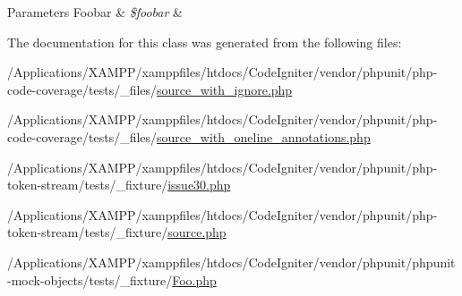 \begin{DoxyParams}[1]{Parameters}
Foobar & {\em \$foobar} & \\
\hline
\end{DoxyParams}


The documentation for this class was generated from the following files\+:\begin{DoxyCompactItemize}
\item 
/\+Applications/\+X\+A\+M\+P\+P/xamppfiles/htdocs/\+Code\+Igniter/vendor/phpunit/php-\/code-\/coverage/tests/\+\_\+files/\mbox{\hyperlink{source__with__ignore_8php}{source\+\_\+with\+\_\+ignore.\+php}}\item 
/\+Applications/\+X\+A\+M\+P\+P/xamppfiles/htdocs/\+Code\+Igniter/vendor/phpunit/php-\/code-\/coverage/tests/\+\_\+files/\mbox{\hyperlink{source__with__oneline__annotations_8php}{source\+\_\+with\+\_\+oneline\+\_\+annotations.\+php}}\item 
/\+Applications/\+X\+A\+M\+P\+P/xamppfiles/htdocs/\+Code\+Igniter/vendor/phpunit/php-\/token-\/stream/tests/\+\_\+fixture/\mbox{\hyperlink{issue30_8php}{issue30.\+php}}\item 
/\+Applications/\+X\+A\+M\+P\+P/xamppfiles/htdocs/\+Code\+Igniter/vendor/phpunit/php-\/token-\/stream/tests/\+\_\+fixture/\mbox{\hyperlink{phpunit_2php-token-stream_2tests_2__fixture_2_source_8php}{source.\+php}}\item 
/\+Applications/\+X\+A\+M\+P\+P/xamppfiles/htdocs/\+Code\+Igniter/vendor/phpunit/phpunit-\/mock-\/objects/tests/\+\_\+fixture/\mbox{\hyperlink{phpunit_2phpunit-mock-objects_2tests_2__fixture_2_foo_8php}{Foo.\+php}}\end{DoxyCompactItemize}
